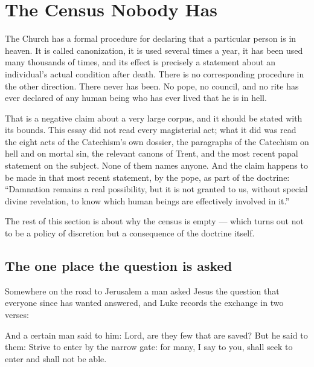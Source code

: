 \section{The Census Nobody Has}

The Church has a formal procedure for declaring that a particular person is in heaven. It is called canonization, it is used several times a year, it has been used many thousands of times, and its effect is precisely a statement about an individual's actual condition after death. There is no corresponding procedure in the other direction. There never has been. No pope, no council, and no rite has ever declared of any human being who has ever lived that he is in hell.

That is a negative claim about a very large corpus, and it should be stated with its bounds. This essay did not read every magisterial act; what it did was read the eight acts of the Catechism's own dossier, the paragraphs of the Catechism on hell and on mortal sin, the relevant canons of Trent, and the most recent papal statement on the subject. None of them names anyone. And the claim happens to be made in that most recent statement, by the pope, as part of the doctrine: ``Damnation remains a real possibility, but it is not granted to us, without special divine revelation, to know which human beings are effectively involved in it.''

The rest of this section is about why the census is empty --- which turns out not to be a policy of discretion but a consequence of the doctrine itself.

\subsection{The one place the question is asked}

Somewhere on the road to Jerusalem a man asked Jesus the question that everyone since has wanted answered, and Luke records the exchange in two verses:

\begin{studyframe}
And a certain man said to him: Lord, are they few that are saved? But he said to them: Strive to enter by the narrow gate: for many, I say to you, shall seek to enter and shall not be able.
\end{studyframe}

